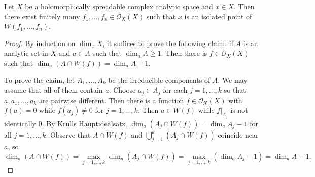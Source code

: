 \begin{proposition}\label{prop-holspreadablelocallyisopt}
    Let $X$ be a holomorphically spreadable complex analytic space and $x\in X$. Then there exist finitely many $f_1,\ldots,f_n\in \mathcal{O}_X(X)$ such that $x$ is an isolated point of $W(f_1,\ldots,f_n)$.
\end{proposition}
\begin{proof}
    By induction on $\dim_x X$, it suffices to prove the following claim: if $A$ is an analytic set in $X$ and $a\in A$ such that $\dim_a A\geq 1$. Then there is $f\in \mathcal{O}_X(X)$ such that $\dim_a (A\cap W(f))=\dim_a A-1$.

    To prove the claim, let $A_1,\ldots,A_k$ be the irreducible components of $A$. We may assume that all of them contain $a$. Choose $a_j\in A_j$ for each $j=1,\ldots,k$ so that $a,a_1,\ldots,a_k$ are pairwise different. Then there is a function $f\in \mathcal{O}_X(X)$ with $f(a)=0$ while $f(a_j)\neq 0$ for $j=1,\ldots,k$. Then $a\in W(f)$ while $f|_{A_j}$ is not identically $0$. By Krulls Hauptidealsatz, $\dim_a (A_j\cap W(f))=\dim_a A_j-1$ for all $j=1,\ldots,k$. Observe that $A\cap W(f)$ and $\bigcup_{j=1}^k (A_j\cap W(f))$ coincide near $a$, so
    \[
        \dim_a (A\cap W(f))=\max_{j=1,\ldots,k} \dim_a (A_j\cap W(f))=\max_{j=1,\ldots,k}(\dim_a A_j-1)=\dim_a A-1.
    \] 
\end{proof}


